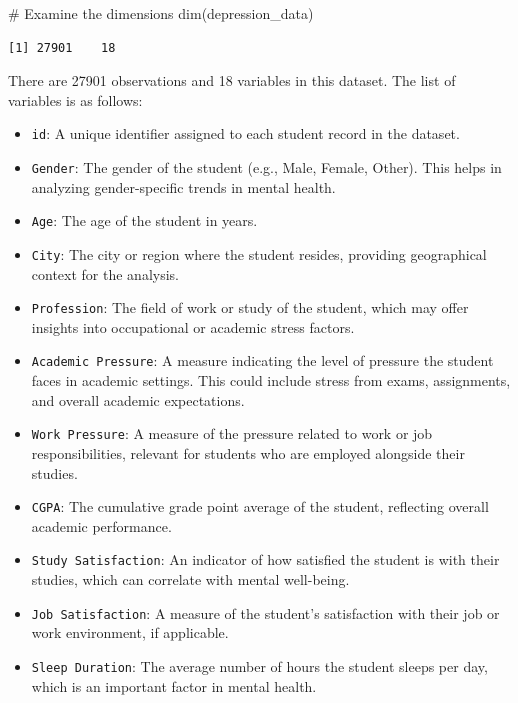\documentclass[
  letterpaper,
  DIV=11,
  numbers=noendperiod]{scrartcl}
\newenvironment{Shaded}{\begin{snugshade}}{\end{snugshade}}
\newcommand{\CommentTok}[1]{\textcolor[rgb]{0.37,0.37,0.37}{#1}}
\newcommand{\FunctionTok}[1]{\textcolor[rgb]{0.28,0.35,0.67}{#1}}
\newcommand{\NormalTok}[1]{\textcolor[rgb]{0.00,0.23,0.31}{#1}}
\begin{document}
\begin{Shaded}
\begin{Highlighting}[numbers=left,,]
\CommentTok{\# Examine the dimensions}
\FunctionTok{dim}\NormalTok{(depression\_data)}
\end{Highlighting}
\end{Shaded}

\begin{verbatim}
[1] 27901    18
\end{verbatim}

There are 27901 observations and 18 variables in this dataset. The list
of variables is as follows:

\begin{itemize}
\item
  \texttt{id}: A unique identifier assigned to each student record in
  the dataset.
\item
  \texttt{Gender}: The gender of the student (e.g., Male, Female,
  Other). This helps in analyzing gender-specific trends in mental
  health.
\item
  \texttt{Age}: The age of the student in years.
\item
  \texttt{City}: The city or region where the student resides, providing
  geographical context for the analysis.
\item
  \texttt{Profession}: The field of work or study of the student, which
  may offer insights into occupational or academic stress factors.
\item
  \texttt{Academic\ Pressure}: A measure indicating the level of
  pressure the student faces in academic settings. This could include
  stress from exams, assignments, and overall academic expectations.
\item
  \texttt{Work\ Pressure}: A measure of the pressure related to work or
  job responsibilities, relevant for students who are employed alongside
  their studies.
\item
  \texttt{CGPA}: The cumulative grade point average of the student,
  reflecting overall academic performance.
\item
  \texttt{Study\ Satisfaction}: An indicator of how satisfied the
  student is with their studies, which can correlate with mental
  well-being.
\item
  \texttt{Job\ Satisfaction}: A measure of the student's satisfaction
  with their job or work environment, if applicable.
\item
  \texttt{Sleep\ Duration}: The average number of hours the student
  sleeps per day, which is an important factor in mental health.

\end{itemize}
\end{document}
